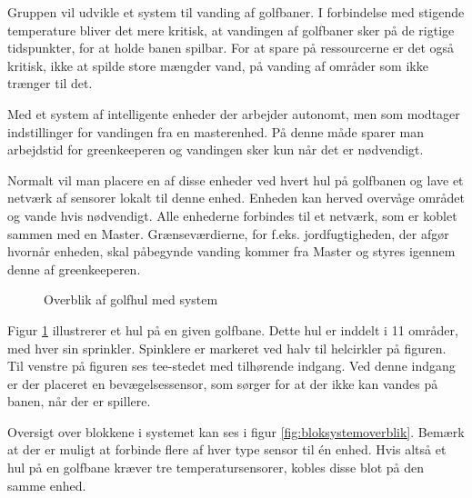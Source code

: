 Gruppen vil udvikle et system til vanding af golfbaner. I forbindelse med stigende temperature bliver det mere kritisk, at vandingen af golfbaner sker på de rigtige tidspunkter, for at holde banen spilbar. For at spare på ressourcerne er det også kritisk, ikke at spilde store mængder vand, på vanding af områder som ikke trænger til det.

Med et system af intelligente enheder der arbejder autonomt, men som modtager indstillinger for vandingen fra en masterenhed. På denne måde sparer man arbejdstid for greenkeeperen og vandingen sker kun når det er nødvendigt.

Normalt vil man placere en af disse enheder ved hvert hul på golfbanen og lave et netværk af sensorer lokalt til denne enhed. Enheden kan herved overvåge området og vande hvis nødvendigt. Alle enhederne forbindes til et netværk, som er koblet sammen med en Master. Grænseværdierne, for f.eks. jordfugtigheden, der afgør hvornår enheden, skal påbegynde vanding kommer fra Master og styres igennem denne af greenkeeperen. 

\begin{figure}[ht] \centering
{}
\caption{Overblik af golfhul med system}
\label{fig:systemoverblik}
\end{figure}

Figur \ref{fig:systemoverblik} illustrerer et hul på en given golfbane. Dette hul er inddelt i 11 områder, med hver sin sprinkler. Spinklere er markeret ved halv til helcirkler på figuren. Til venstre på figuren ses tee-stedet med tilhørende indgang. Ved denne indgang er der placeret en bevægelsessensor, som sørger for at der ikke kan vandes på banen, når der er spillere. 

Oversigt over blokkene i systemet kan ses i figur \ref{fig:bloksystemoverblik}.
Bemærk at der er muligt at forbinde flere af hver type sensor til én enhed. Hvis altså et hul på en golfbane kræver tre temperatursensorer, kobles disse blot på den samme enhed.

